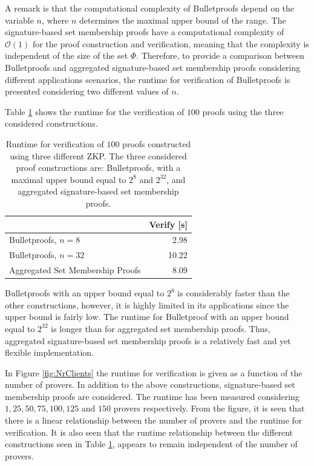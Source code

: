 A remark is that the computational complexity of Bulletproofs depend on the variable $n$, where $n$ determines the maximal upper bound of the range. The signature-based set membership proofs have a computational complexity of $\mathcal{O}(1)$ for the proof construction and verification, meaning that the complexity is independent of the size of the set $\Phi$. Therefore, to provide a comparison between Bulletproofs and aggregated signature-based set membership proofs considering different applications scenarios,  the runtime for verification of Bulletproofs is presented considering two different values of $n$.

Table \ref{tab:CompareToBulletproof} shows the runtime for the verification of $100$ proofs using the three considered constructions.

\begin{table}
\centering
\caption{Runtime for verification of $100$ proofs constructed using three different ZKP. The three considered proof constructions are: Bulletproofs, with a maximal upper bound equal to $2^8$ and $2^{32}$, and aggregated signature-based set membership proofs. }
\begin{tabular}{l | r }
\toprule
	  											& \textbf{Verify} [s]\\	\midrule
  Bulletproofs, $n=8$					&   2.98 		\\ 
  Bulletproofs, $n=32$					&   10.22 		\\ 
  Aggregated Set Membership Proofs 	&   8.09 	 \\ 
  \bottomrule 
\end{tabular}
\label{tab:CompareToBulletproof}
\end{table}

Bulletproofs with an upper bound equal to $2^8$ is considerably faster than the other constructions, however, it is highly limited in its applications since the upper bound is fairly low. The runtime for Bulletproof with an upper bound equal to $2^{32}$ is longer than for aggregated set membership proofs. Thus, aggregated signature-based set membership proofs is a relatively fast and yet flexible implementation. 

In Figure \ref{fig:NrClients} the runtime for verification is given as a function of the number of provers. In addition to the above constructions, signature-based set membership proofs are considered. The runtime has been measured considering  $1,25,50,75,100,125$ and $150$ provers respectively.  From the figure, it is seen that there is a linear relationship between the number of provers and the runtime for verification. It is also seen that the runtime relationship between the different constructions seen in Table \ref{tab:CompareToBulletproof}, appears to remain independent of the number of provers. 

